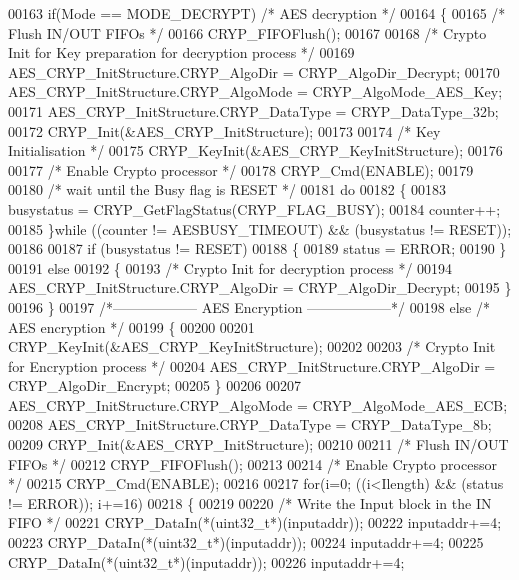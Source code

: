 \begin{DoxyCode}
00163   \textcolor{keywordflow}{if}(Mode == MODE_DECRYPT) \textcolor{comment}{/* AES decryption */}
00164   \{
00165     \textcolor{comment}{/* Flush IN/OUT FIFOs */}
00166     CRYP_FIFOFlush();
00167 
00168     \textcolor{comment}{/* Crypto Init for Key preparation for decryption process */}
00169     AES\_CRYP\_InitStructure.CRYP_AlgoDir = CRYP_AlgoDir_Decrypt;
00170     AES\_CRYP\_InitStructure.CRYP_AlgoMode = CRYP_AlgoMode_AES_Key;
00171     AES\_CRYP\_InitStructure.CRYP_DataType = CRYP_DataType_32b;
00172     CRYP_Init(&AES\_CRYP\_InitStructure);
00173 
00174     \textcolor{comment}{/* Key Initialisation */}
00175     CRYP_KeyInit(&AES\_CRYP\_KeyInitStructure);
00176 
00177     \textcolor{comment}{/* Enable Crypto processor */}
00178     CRYP_Cmd(ENABLE);
00179 
00180     \textcolor{comment}{/* wait until the Busy flag is RESET */}
00181     \textcolor{keywordflow}{do}
00182     \{
00183       busystatus = CRYP\_GetFlagStatus(CRYP_FLAG_BUSY);
00184       counter++;
00185     \}\textcolor{keywordflow}{while} ((counter != AESBUSY_TIMEOUT) && (busystatus != RESET));
00186 
00187     \textcolor{keywordflow}{if} (busystatus != RESET)
00188    \{
00189        status = ERROR;
00190     \}
00191     \textcolor{keywordflow}{else}
00192     \{
00193       \textcolor{comment}{/* Crypto Init for decryption process */}
00194       AES\_CRYP\_InitStructure.CRYP\_AlgoDir = CRYP_AlgoDir_Decrypt;
00195     \}
00196   \}
00197   \textcolor{comment}{/*------------------ AES Encryption ------------------*/}
00198   \textcolor{keywordflow}{else} \textcolor{comment}{/* AES encryption */}
00199   \{
00200 
00201     CRYP_KeyInit(&AES\_CRYP\_KeyInitStructure);
00202 
00203     \textcolor{comment}{/* Crypto Init for Encryption process */}
00204     AES\_CRYP\_InitStructure.CRYP_AlgoDir  = CRYP_AlgoDir_Encrypt;
00205   \}
00206 
00207   AES\_CRYP\_InitStructure.CRYP_AlgoMode = CRYP_AlgoMode_AES_ECB;
00208   AES\_CRYP\_InitStructure.CRYP_DataType = CRYP_DataType_8b;
00209   CRYP_Init(&AES\_CRYP\_InitStructure);
00210 
00211   \textcolor{comment}{/* Flush IN/OUT FIFOs */}
00212   CRYP_FIFOFlush();
00213 
00214   \textcolor{comment}{/* Enable Crypto processor */}
00215   CRYP_Cmd(ENABLE);
00216 
00217   \textcolor{keywordflow}{for}(i=0; ((i<Ilength) && (status != ERROR)); i+=16)
00218   \{
00219 
00220     \textcolor{comment}{/* Write the Input block in the IN FIFO */}
00221     CRYP\_DataIn(*(uint32\_t*)(inputaddr));
00222     inputaddr+=4;
00223     CRYP\_DataIn(*(uint32\_t*)(inputaddr));
00224     inputaddr+=4;
00225     CRYP\_DataIn(*(uint32\_t*)(inputaddr));
00226     inputaddr+=4;

\end{DoxyCode}
